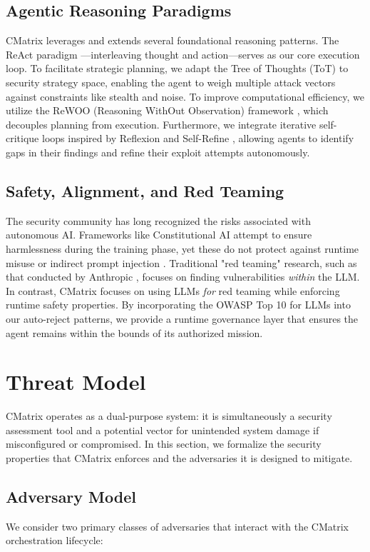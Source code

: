 \documentclass[conference,compsoc]{IEEEtran}
\begin{document}
\subsection{Agentic Reasoning Paradigms}
CMatrix leverages and extends several foundational reasoning patterns. The ReAct paradigm \cite{react}---interleaving thought and action---serves as our core execution loop. To facilitate strategic planning, we adapt the Tree of Thoughts (ToT) \cite{tot} to security strategy space, enabling the agent to weigh multiple attack vectors against constraints like stealth and noise. To improve computational efficiency, we utilize the ReWOO (Reasoning WithOut Observation) framework \cite{rewoo}, which decouples planning from execution. Furthermore, we integrate iterative self-critique loops inspired by Reflexion \cite{reflexion} and Self-Refine \cite{selfrefine}, allowing agents to identify gaps in their findings and refine their exploit attempts autonomously.

\subsection{Safety, Alignment, and Red Teaming}
The security community has long recognized the risks associated with autonomous AI. Frameworks like Constitutional AI \cite{constitutionalai} attempt to ensure harmlessness during the training phase, yet these do not protect against runtime misuse or indirect prompt injection \cite{greshake}. Traditional "red teaming" research, such as that conducted by Anthropic \cite{ganguli2022red, perez2022red}, focuses on finding vulnerabilities \textit{within} the LLM. In contrast, CMatrix focuses on using LLMs \textit{for} red teaming while enforcing runtime safety properties. By incorporating the OWASP Top 10 for LLMs \cite{owaspllm} into our auto-reject patterns, we provide a runtime governance layer that ensures the agent remains within the bounds of its authorized mission.

\section{Threat Model} \label{sec:threat}
CMatrix operates as a dual-purpose system: it is simultaneously a security assessment tool and a potential vector for unintended system damage if misconfigured or compromised. In this section, we formalize the security properties that CMatrix enforces and the adversaries it is designed to mitigate.

\subsection{Adversary Model}
We consider two primary classes of adversaries that interact with the CMatrix orchestration lifecycle:
\end{document}

